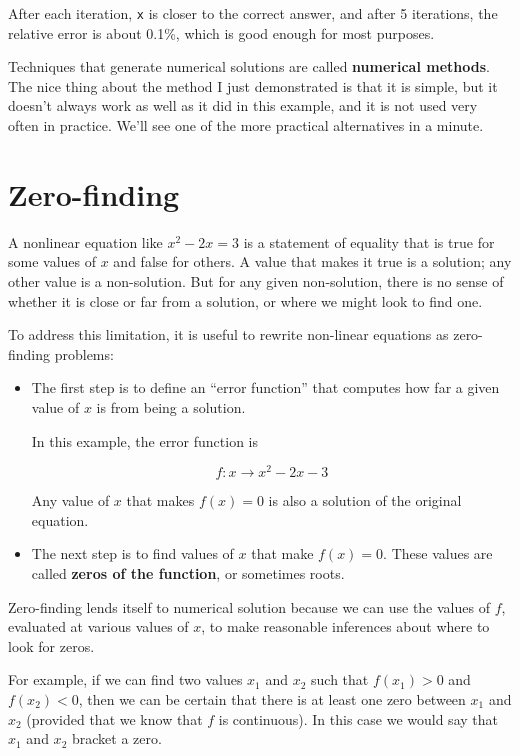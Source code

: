 After each iteration, {\tt x} is closer to the correct answer,
and after 5 iterations, the relative error is about 0.1\%, which
is good enough for most purposes.

Techniques that generate numerical solutions are called
{\bf numerical methods}. The nice thing about the method I
just demonstrated is that it is simple, but it doesn't always
work as well as it did in this example, and it is not used
very often in practice. We'll see one of
the more practical alternatives in a minute.




\section{Zero-finding}
\label{zero}

A nonlinear equation like $x^2 - 2x = 3$ is a statement of
equality that is true for some values of $x$ and false for
others. A value that makes it true is a solution;
any other value is a non-solution. But for any given non-solution,
there is no sense of whether it is close or far from a solution,
or where we might look to find one.

To address this limitation, it is useful to
rewrite non-linear equations as zero-finding problems:

\begin{itemize}

\item The first step is to define
an ``error function'' that computes how far
a given value of $x$ is from being a solution.

In this example, the error function is

\[ f : x \to x^2 - 2x -3 \]

Any value of $x$ that makes $f(x) = 0$ is also a solution
of the original equation.

\item The next step is to find values of $x$ that make
$f(x) = 0$. These values are called {\bf zeros of the
function}, or sometimes roots.

\end{itemize}

Zero-finding lends itself to numerical solution because we can
use the values of $f$, evaluated at various values of $x$, to
make reasonable inferences about where to look for zeros.

For example, if we can find two values $x_1$ and $x_2$ such that
$f(x_1) > 0$ and $f(x_2) < 0$, then we can be certain that there is at
least one zero between $x_1$ and $x_2$ (provided that we know that $f$
is continuous). In this case we would say that $x_1$ and $x_2$
bracket a zero.

